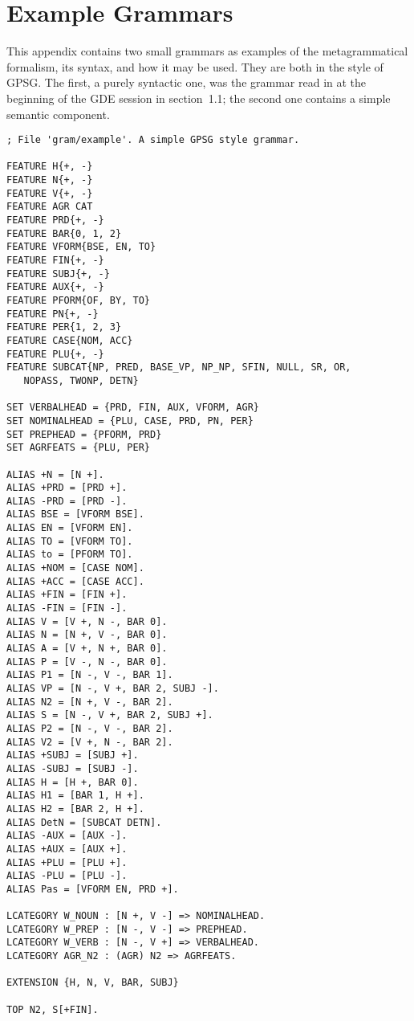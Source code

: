 \appendix
\chapter{Example Grammars}

This appendix contains two small grammars as examples of the metagrammatical
formalism, its syntax, and how it may be used. They are both in
the style of GPSG. The first, a purely syntactic one, was the grammar read in
at the beginning of the GDE session in section~1.1; the second one
contains a simple semantic component. 

{\small
\begin{verbatim}
; File 'gram/example'. A simple GPSG style grammar.

FEATURE H{+, -}
FEATURE N{+, -}
FEATURE V{+, -}
FEATURE AGR CAT
FEATURE PRD{+, -}
FEATURE BAR{0, 1, 2}
FEATURE VFORM{BSE, EN, TO}
FEATURE FIN{+, -}
FEATURE SUBJ{+, -}
FEATURE AUX{+, -}
FEATURE PFORM{OF, BY, TO}
FEATURE PN{+, -}
FEATURE PER{1, 2, 3}
FEATURE CASE{NOM, ACC}
FEATURE PLU{+, -}
FEATURE SUBCAT{NP, PRED, BASE_VP, NP_NP, SFIN, NULL, SR, OR,
   NOPASS, TWONP, DETN}

SET VERBALHEAD = {PRD, FIN, AUX, VFORM, AGR}
SET NOMINALHEAD = {PLU, CASE, PRD, PN, PER}
SET PREPHEAD = {PFORM, PRD}
SET AGRFEATS = {PLU, PER}

ALIAS +N = [N +].
ALIAS +PRD = [PRD +].
ALIAS -PRD = [PRD -].
ALIAS BSE = [VFORM BSE].
ALIAS EN = [VFORM EN].
ALIAS TO = [VFORM TO].
ALIAS to = [PFORM TO].
ALIAS +NOM = [CASE NOM].
ALIAS +ACC = [CASE ACC].
ALIAS +FIN = [FIN +].
ALIAS -FIN = [FIN -].
ALIAS V = [V +, N -, BAR 0].
ALIAS N = [N +, V -, BAR 0].
ALIAS A = [V +, N +, BAR 0].
ALIAS P = [V -, N -, BAR 0].
ALIAS P1 = [N -, V -, BAR 1].
ALIAS VP = [N -, V +, BAR 2, SUBJ -].
ALIAS N2 = [N +, V -, BAR 2].
ALIAS S = [N -, V +, BAR 2, SUBJ +].
ALIAS P2 = [N -, V -, BAR 2].
ALIAS V2 = [V +, N -, BAR 2].
ALIAS +SUBJ = [SUBJ +].
ALIAS -SUBJ = [SUBJ -].
ALIAS H = [H +, BAR 0].
ALIAS H1 = [BAR 1, H +].
ALIAS H2 = [BAR 2, H +].
ALIAS DetN = [SUBCAT DETN].
ALIAS -AUX = [AUX -].
ALIAS +AUX = [AUX +].
ALIAS +PLU = [PLU +].
ALIAS -PLU = [PLU -].
ALIAS Pas = [VFORM EN, PRD +].

LCATEGORY W_NOUN : [N +, V -] => NOMINALHEAD.
LCATEGORY W_PREP : [N -, V -] => PREPHEAD.
LCATEGORY W_VERB : [N -, V +] => VERBALHEAD.
LCATEGORY AGR_N2 : (AGR) N2 => AGRFEATS.

EXTENSION {H, N, V, BAR, SUBJ}

TOP N2, S[+FIN].


\end{verbatim}}
